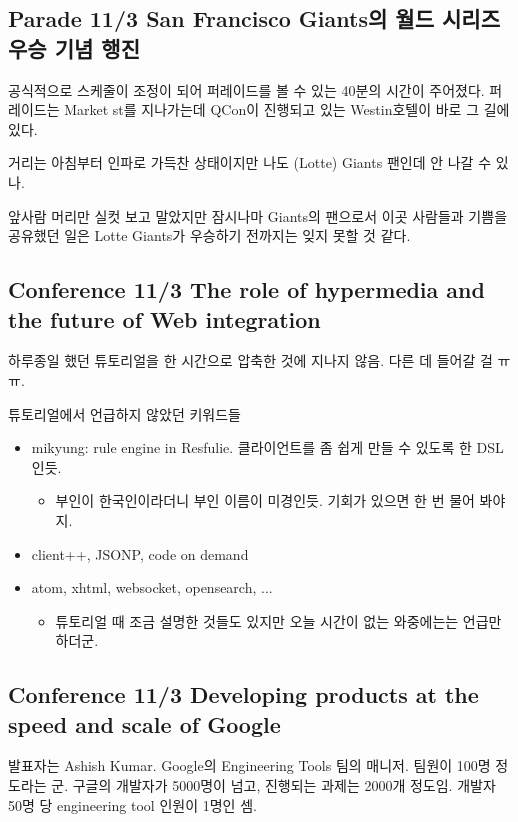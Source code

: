 \documentclass[a4paper]{article}
\begin{document}
\subsection{Parade 11/3 San Francisco Giants의 월드 시리즈 우승 기념 행진}
 
공식적으로 스케줄이 조정이 되어 퍼레이드를 볼 수 있는 40분의 시간이 주어졌다.
퍼레이드는 Market st를 지나가는데 QCon이 진행되고 있는 Westin호텔이 바로 그 길에 있다.
 
거리는 아침부터 인파로 가득찬 상태이지만 나도  (Lotte) Giants 팬인데 안 나갈 수 있나.
 
앞사람 머리만 실컷 보고 말았지만 잠시나마 Giants의 팬으로서 이곳 사람들과 기쁨을 공유했던 일은 Lotte Giants가 우승하기 전까지는 잊지 못할 것 같다.
 
\subsection{Conference 11/3 The role of hypermedia and the future of Web integration}
 
하루종일 했던 튜토리얼을 한 시간으로 압축한 것에 지나지 않음. 다른 데 들어갈 걸 ㅠㅠ.
 
튜토리얼에서 언급하지 않았던 키워드들
\begin{itemize}
\item mikyung: rule engine in Resfulie. 클라이언트를 좀 쉽게 만들 수 있도록 한 DSL인듯.
  \begin{itemize}
  \item 부인이 한국인이라더니 부인 이름이 미경인듯. 기회가 있으면 한 번 물어 봐야지.
  \end{itemize}
\item client++, JSONP, code on demand
\item atom, xhtml, websocket, opensearch, ...
  \begin{itemize}
  \item 튜토리얼 때 조금 설명한 것들도 있지만 오늘 시간이 없는 와중에는는 언급만 하더군.
  \end{itemize}
\end{itemize}
 
\subsection{Conference 11/3 Developing products at the speed and scale of Google}
 
발표자는 Ashish Kumar. Google의 Engineering Tools 팀의 매니저. 팀원이 100명 정도라는 군.
구글의 개발자가 5000명이 넘고, 진행되는 과제는 2000개 정도임. 개발자 50명 당 engineering tool 인원이 1명인 셈.
 
\end{document}
